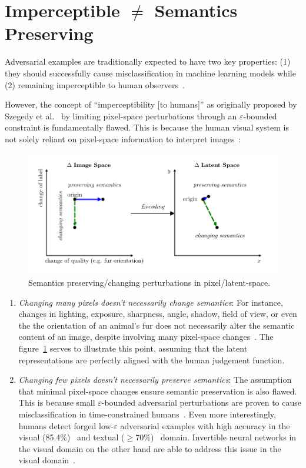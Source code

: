 \documentclass[a4paper, oneside]{discothesis}
\begin{document}
\section{Imperceptible $\not=$ Semantics Preserving}

Adversarial examples are traditionally expected to have two key properties: (1) they should successfully cause misclassification in machine learning models while (2) remaining imperceptible to human observers~\cite{cubuk2017intriguing}.

However, the concept of ``imperceptibility [to humans]'' as originally proposed by Szegedy et al.~\cite{szegedy2013intriguing} by limiting pixel-space perturbations through an $\varepsilon$-bounded constraint is fundamentally flawed. This is because the human visual system is not solely reliant on pixel-space information to interpret images~\cite{ ning2023hflic}:

\begin{figure}
    \centering
    \includegraphics[width=1\columnwidth]{figures/latentspace.pdf}
    \caption{Semantics preserving/changing perturbations in pixel/latent-space.}
    \label{fig:latentspace}
\end{figure}

\begin{enumerate}
	\item \textit{Changing many pixels doesn't necessarily change semantics}: For instance, changes in lighting, exposure, sharpness, angle, shadow, field of view, or even the the orientation of an animal's fur does not necessarily alter the semantic content of an image, despite involving many pixel-space changes~\cite{kilcher2021dimpled}. The figure~\ref{fig:latentspace} serves to illustrate this point, assuming that the latent representations are perfectly aligned with the human judgement function.

	\item \textit{Changing few pixels doesn't necessarily preserve semantics}: The assumption that minimal pixel-space changes ensure semantic preservation is also flawed. This is because small $\varepsilon$-bounded adversarial perturbations are proven to cause misclassification in time-constrained humans~\cite{elsayed2018adversarial}. Even more interestingly, humans detect forged low-$\varepsilon$ adversarial examples with high accuracy in the visual (85.4\%)~\cite{veerabadran2023subtle} and textual ($\geq$70\%)~\cite{herel2023preserving} domain. Invertible neural networks in the visual domain on the other hand are able to address this issue in the visual domain~\cite{chen2023imperceptible}.
\end{enumerate}
\end{document}
